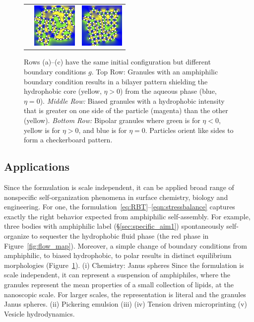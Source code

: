 \begin{figure}
\begin{center}
\begin{tabular}{m{0.9in}m{0.9in}m{0.9in}}
      &\includegraphics[width=0.85in]{figures/SpecificAim1/N100A2.jpg}
      &\includegraphics[width=0.85in]{figures/SpecificAim1/N100A3.jpg} 
  \end{tabular}
  \end{center}
  \vspace{-5pt}
  \caption{\footnotesize \label{fig:self-assembly2} Rows (a)--(c) have
  the same initial configuration but different boundary conditions $g$.
  {Top Row:} Granules with an amphiphilic boundary condition
  results in a bilayer pattern shielding the hydrophobic core (yellow,
  $\eta > 0$) from the aqueous phase (blue, $\eta = 0$). {\em Middle
  Row:} Biased granules with a hydrophobic intensity that is greater on
  one side of the particle (magenta) than the other (yellow). {\em
  Bottom Row:} Bipolar granules where green is for $\eta < 0$, yellow is
  for $\eta > 0$, and blue is for $\eta = 0$. Particles orient like
  sides to form a checkerboard pattern.}
\end{figure}

\subsection{Applications}
Since the formulation is scale independent, it can be applied broad
range of nonspecific self-organization phenomena in surface chemistry,
biology and engineering. For one, the
formulation~\eqref{eq:RBT}--\eqref{eqn:stressbalance} captures exactly
the right behavior expected from amphiphilic self-assembly. For example,
three bodies with amphiphilic label (\S\ref{sec:specific_aim1})
spontaneously self-organize to sequester the hydrophobic fluid phase
(the red phase in Figure~\ref{fig:flow_map}).  Moreover, a simple change
of boundary conditions from amphiphilic, to biased hydrophobic, to polar
results in distinct equilibrium morphologies
(Figure~\ref{fig:self-assembly2}). (i) Chemistry: Janus spheres Since
the formulation is scale independent, it can represent a suspension of
amphiphiles, where the granules represent the mean properties of a small
collection of lipids, at the nanoscopic scale. For larger scales, the
representation is literal and the granules Janus spheres. (ii) Pickering
emulsion (iii)  (iv) Tension driven
microprinting (v) Vesicle hydrodynamics.


